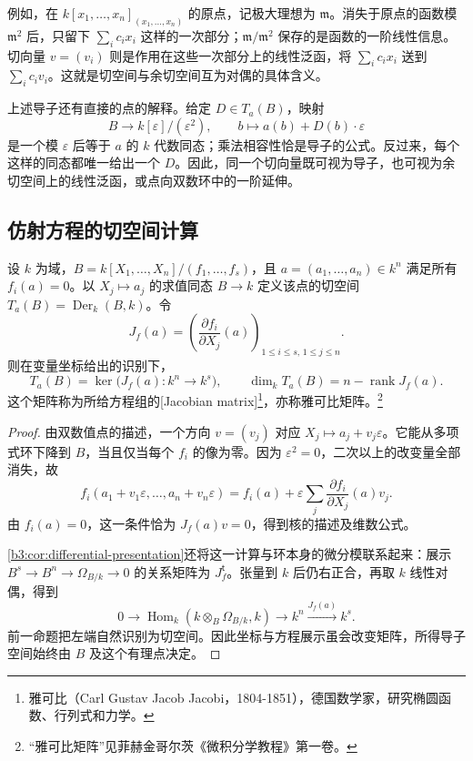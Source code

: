 例如，在 \(k[x_1,\ldots,x_n]_{(x_1,\ldots,x_n)}\) 的原点，记极大理想为 \(\mathfrak m\)。消失于原点的函数模 \(\mathfrak m^2\) 后，只留下 \(\sum_i c_ix_i\) 这样的一次部分；\(\mathfrak m/\mathfrak m^2\) 保存的是函数的一阶线性信息。切向量 \(v=(v_i)\) 则是作用在这些一次部分上的线性泛函，将 \(\sum_i c_ix_i\) 送到 \(\sum_i c_iv_i\)。这就是切空间与余切空间互为对偶的具体含义。

上述导子还有直接的点的解释。给定 \(D\in T_a(B)\)，映射
\[
	B\longrightarrow k[\varepsilon]/(\varepsilon^2),\qquad b\longmapsto a(b)+D(b)\cdot\varepsilon
\]
是一个模 \(\varepsilon\) 后等于 \(a\) 的 \(k\) 代数同态；乘法相容性恰是导子的公式。反过来，每个这样的同态都唯一给出一个 \(D\)。因此，同一个切向量既可视为导子，也可视为余切空间上的线性泛函，或点向双数环中的一阶延伸。

\subsection{仿射方程的切空间计算}
\label{b3:subsec:1403:02}

\begin{theorem}\label{b3:thm:jacobian-tangent-space}
	设 \(k\) 为域，\(B=k[X_1,\ldots,X_n]/(f_1,\ldots,f_s)\)，且 \(a=(a_1,\ldots,a_n)\in k^n\) 满足所有 \(f_i(a)=0\)。以 \(X_j\mapsto a_j\) 的求值同态 \(B\to k\) 定义该点的切空间 \(T_a(B)=\operatorname{Der}_k(B,k)\)。令
	\[
		J_f(a)=\left(\dfrac{\partial f_i}{\partial X_j}(a)\right)_{ 1\le i\le s,\,1\le j\le n}.
	\]
	则在变量坐标给出的识别下，
	\[
		T_a(B)=\ker\bigl(J_f(a):k^n\to k^s\bigr), \qquad \dim_kT_a(B)=n-\operatorname{rank}J_f(a).
	\]
	这个矩阵称为所给方程组的[Jacobian matrix]\footnote{雅可比（Carl Gustav Jacob Jacobi，1804-1851），德国数学家，研究椭圆函数、行列式和力学。}，亦称雅可比矩阵。\footnote{“雅可比矩阵”见菲赫金哥尔茨《微积分学教程》第一卷\cite[第六章“函数矩阵(雅可比矩阵)的乘法”]{Fichtenholz2005CalculusChineseI}。}
\end{theorem}
\begin{proof}
	由双数值点的描述，一个方向 \(v=(v_j)\) 对应 \(X_j\mapsto a_j+v_j\varepsilon\)。它能从多项式环下降到 \(B\)，当且仅当每个 \(f_i\) 的像为零。因为 \(\varepsilon^2=0\)，二次以上的改变量全部消失，故
	\[
		f_i(a_1+v_1\varepsilon,\ldots,a_n+v_n\varepsilon) =f_i(a)+\varepsilon\sum_j \dfrac{\partial f_i}{\partial X_j}(a)v_j.
	\]
	由 \(f_i(a)=0\)，这一条件恰为 \(J_f(a)v=0\)，得到核的描述及维数公式。

	\cref{b3:cor:differential-presentation}还将这一计算与环本身的微分模联系起来：展示 \(B^s\to B^n\to\Omega_{B/k}\to0\) 的关系矩阵为 \(J_f^{\mathsf t}\)。张量到 \(k\) 后仍右正合，再取 \(k\) 线性对偶，得到
	\[
		0\longrightarrow\operatorname{Hom}_k(k\otimes_B\Omega_{B/k},k) \longrightarrow k^n\xrightarrow{J_f(a)}k^s.
	\]
	前一命题把左端自然识别为切空间。因此坐标与方程展示虽会改变矩阵，所得导子空间始终由 \(B\) 及这个有理点决定。
\end{proof}

